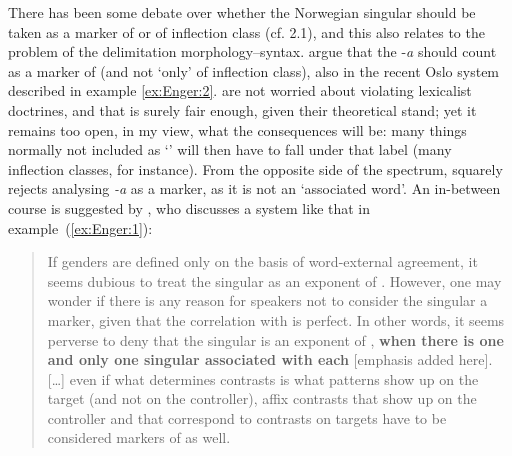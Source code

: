 \documentclass[output=paper]{langsci/langscibook}
\begin{document}
\begin{exe}
\begin{xlist}
\begin{xlist}
There has been some debate over whether the Norwegian  singular
 should be taken as a marker of  or of inflection class (cf.
2.1), and this also relates to the problem of the delimitation
morphology--syntax. %
\citet{Afarli15} %
%
argue that the 
-\emph{a} should count as a marker of  (and not `only' of
inflection class), also in the recent Oslo system described in example \ref{ex:Enger:2}. %
\citeauthor{Afarli15} %
%
are not worried about violating lexicalist
doctrines, and that is surely fair enough, given their theoretical
stand; yet it remains too open, in my view, what the consequences will
be: many things normally not included as `' will then have to fall
under that label (many inflection classes, for instance). From the
opposite side of the spectrum, %
\citet{Lodrup11} %
%
squarely rejects analysing
\emph{-a} as a  marker, as it is not an `associated word'. An
in-between course is suggested by
%
\citet{Enger2004a}%
%
, who discusses a system like that in example~(\ref{ex:Enger:1}):

\begin{quote}
If genders are defined only on the basis of word-external agreement, it
seems dubious to treat the  singular  as an exponent of
. However, one may wonder if there is any reason for speakers not
to consider the  singular  a  marker, given that the
correlation with  is perfect. In other words, it seems perverse to
deny that the  singular  is an exponent of ,
\textbf{when there is one and only one  singular 
associated with each } {[}emphasis added here{]}. {[}\ldots{}{]}
even if what determines  contrasts is what patterns show up on the
target (and not on the controller), affix contrasts that show up on the
controller and that correspond to  contrasts on targets have to be
considered markers of  as well. \citep[65]{Enger2004a}
\end{quote}


\end{xlist}
\end{xlist}
\end{exe}
\end{document}
